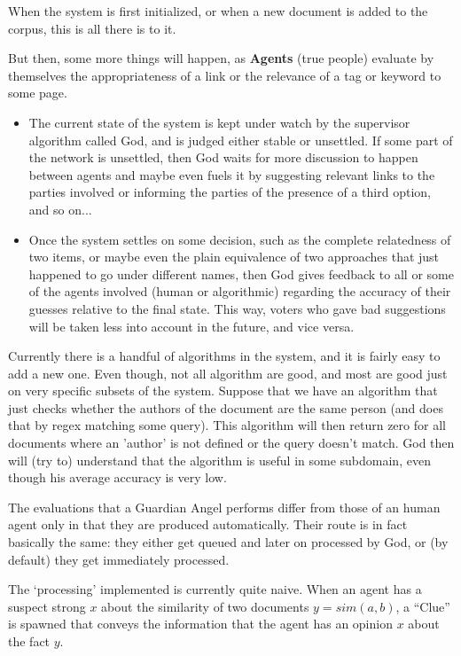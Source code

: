 \documentclass[11pt]{article}
\begin{document}
When the system is first initialized, or when a new document is added to the corpus, this is all there is to it.

But then, some more things will happen, as {\bf Agents} (true people) evaluate by themselves the appropriateness of a link or the relevance of a tag or keyword to some page.

\begin{itemize}
\item The current state of the system is kept under watch by the supervisor algorithm called God, and is judged either stable or unsettled. If some part of the network is unsettled, then God waits for more discussion to happen between agents and maybe even fuels it by suggesting relevant links to the parties involved or informing the parties of the presence of a third option, and so on...
\item Once the system settles on some decision, such as the complete relatedness of two items, or maybe even the plain equivalence of two approaches that just happened to go under different names, then God gives feedback to all or some of the agents involved (human or algorithmic) regarding the accuracy of their guesses relative to the final state. This way, voters who gave bad suggestions will be taken less into account in the future, and vice versa.
\end{itemize}

Currently there is a handful of algorithms in the system, and it is fairly easy to add a new one. Even though, not all algorithm are good, and most are good just on very specific subsets of the system. Suppose that we have an algorithm that just checks whether the authors of the document are the same person (and does that by regex matching some query). This algorithm will then return zero for all documents where an 'author' is not defined or the query doesn't match. God then will (try to) understand that the algorithm is useful in some subdomain, even though his average accuracy is very low.

The evaluations that a Guardian Angel performs differ from those of an human agent only in that they are produced automatically. Their route is in fact basically the same: they either get queued and later on processed by God, or (by default) they get immediately processed.

The `processing' implemented is currently quite naive. When an agent has a suspect strong $x$ about the similarity of two documents $y=sim(a,b)$, a ``Clue'' is spawned that conveys the information that the agent has an opinion $x$ about the fact $y$.
\end{document}
